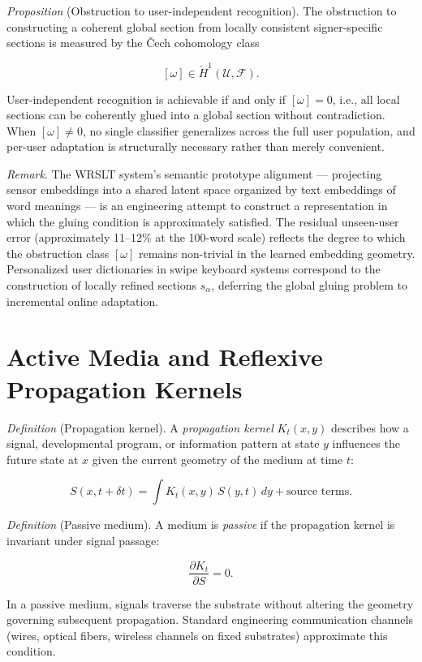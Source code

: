 \documentclass[11pt, a4paper]{article}
\theoremstyle{definition}
\begin{document}
\textit{Proposition} (Obstruction to user-independent recognition). The obstruction to constructing a coherent global section from locally consistent signer-specific sections is measured by the \v{C}ech cohomology class

\[
[\omega] \in \check{H}^1(\mathcal{U}, \mathcal{F}).
\]

User-independent recognition is achievable if and only if $[\omega] = 0$, i.e., all local sections can be coherently glued into a global section without contradiction. When $[\omega] \neq 0$, no single classifier generalizes across the full user population, and per-user adaptation is structurally necessary rather than merely convenient.

\textit{Remark}. The WRSLT system's semantic prototype alignment --- projecting sensor embeddings into a shared latent space organized by text embeddings of word meanings --- is an engineering attempt to construct a representation in which the gluing condition is approximately satisfied. The residual unseen-user error (approximately 11--12\% at the 100-word scale) reflects the degree to which the obstruction class $[\omega]$ remains non-trivial in the learned embedding geometry. Personalized user dictionaries in swipe keyboard systems correspond to the construction of locally refined sections $s_\alpha$, deferring the global gluing problem to incremental online adaptation.

\section{Active Media and Reflexive Propagation Kernels}
\label{app:activemedia}

\textit{Definition} (Propagation kernel). A \emph{propagation kernel} $K_t(x, y)$ describes how a signal, developmental program, or information pattern at state $y$ influences the future state at $x$ given the current geometry of the medium at time $t$:

\[
S(x, t + \delta t) = \int K_t(x, y)\, S(y, t)\, dy + \text{source terms}.
\]

\textit{Definition} (Passive medium). A medium is \emph{passive} if the propagation kernel is invariant under signal passage:

\[
\frac{\partial K_t}{\partial S} = 0.
\]

In a passive medium, signals traverse the substrate without altering the geometry governing subsequent propagation. Standard engineering communication channels (wires, optical fibers, wireless channels on fixed substrates) approximate this condition.
\end{document}

